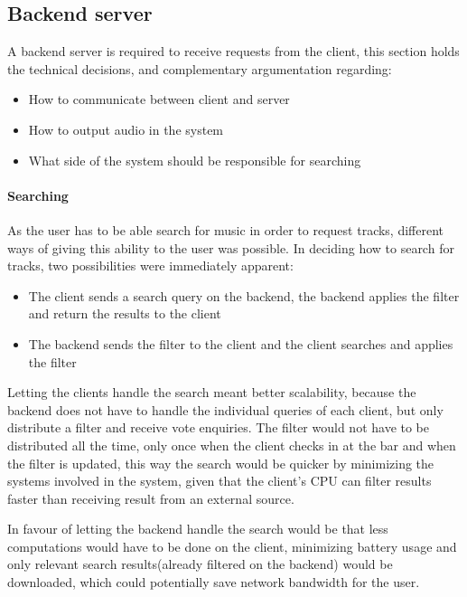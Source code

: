 \subsection{Backend server}

A backend server is required to receive requests from the client, this section holds the technical decisions, and complementary argumentation regarding: 
\begin{itemize}
  \item How to communicate between client and server
  \item How to output audio in the system
  \item What side of the system should be responsible for searching
\end{itemize}

\paragraph{Searching}
As the user has to be able search for music in order to request tracks, different ways of giving this ability to the user was possible. In deciding how to search for tracks, two possibilities were immediately apparent: 
\begin{itemize}
  \item The client sends a search query on the backend, the backend applies the filter and return the results to the client 
  \item The backend sends the filter to the client and the client searches and applies the filter
\end{itemize}
Letting the clients handle the search meant better scalability, because the backend does not have to handle the individual queries of each client, but only distribute a filter and receive vote enquiries. The filter would not have to be distributed all the time, only once when the client checks in at the bar and when the filter is updated, this way the search would be quicker by minimizing the systems involved in the system, given that the client's CPU can filter results faster than receiving result from an external source. 

In favour of letting the backend handle the search would be that less computations would have to be done on the client, minimizing battery usage and only relevant search results(already filtered on the backend) would be downloaded, which could potentially save network bandwidth for the user. 